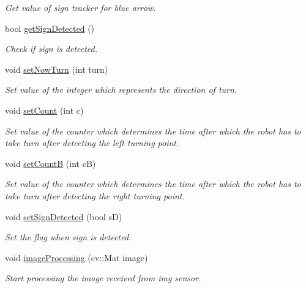 \begin{DoxyCompactItemize}
\begin{DoxyCompactList}\small\item\em Get value of sign tracker for blue arrow. \end{DoxyCompactList}\item 
bool \mbox{\hyperlink{class_camera_a0f8951959a2822e6b729a9fe05b428ef}{get\+Sign\+Detected}} ()
\begin{DoxyCompactList}\small\item\em Check if sign is detected. \end{DoxyCompactList}\item 
void \mbox{\hyperlink{class_camera_a77cd72118fd9d03e04beaf60f7345138}{set\+Now\+Turn}} (int turn)
\begin{DoxyCompactList}\small\item\em Set value of the integer which represents the direction of turn. \end{DoxyCompactList}\item 
void \mbox{\hyperlink{class_camera_a3186b8e7cf648308237a2ba440379e34}{set\+Count}} (int c)
\begin{DoxyCompactList}\small\item\em Set value of the counter which determines the time after which the robot has to take turn after detecting the left turning point. \end{DoxyCompactList}\item 
void \mbox{\hyperlink{class_camera_a66d6f05a42feb58468bc4039b07b1b23}{set\+CountB}} (int cB)
\begin{DoxyCompactList}\small\item\em Set value of the counter which determines the time after which the robot has to take turn after detecting the right turning point. \end{DoxyCompactList}\item 
void \mbox{\hyperlink{class_camera_ab51102514272832890346b414759e716}{set\+Sign\+Detected}} (bool sD)
\begin{DoxyCompactList}\small\item\em Set the flag when sign is detected. \end{DoxyCompactList}\item 
void \mbox{\hyperlink{class_camera_a476073362ca2d7f38cfc4662aeeafb0e}{image\+Processing}} (cv\+::\+Mat image)
\begin{DoxyCompactList}\small\item\em Start processing the image received from img sensor. \end{DoxyCompactList}\end{DoxyCompactItemize}



